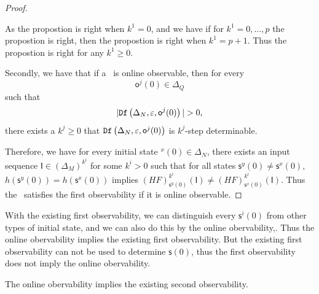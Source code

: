 \begin{proof}
\begin{itemize}
\end{itemize}
As the propostion is right when $k^{1}=0$, and we have if for $k^{1}=0,\ldots, p$ the propostion is right, then the propostion is right when $k^{1}=p+1$. Thus the propostion is right for any $k^{1}\ge0$.

Secondly, we have that if a \BCN\ is online observable,
then for every  \[\mathsf{o}^{j}(0)\in \Delta_Q\] such that \[|\Ded\left(\Delta_N,\varepsilon, \mathsf{o}^{j}(0)\right)|> 0,\] there exists a $k^{j}\ge0$ that ${\tt Df}\left(\Delta_N,\varepsilon,\mathsf{o}^{j}(0)\right)$ is $k^{j}$-step determinable. 

Therefore, we have for every initial state \State$^{x}(0)$$\in \Delta_N$, there exists an input sequence $\mathsf{I}\in(\Delta_M)^{k^i}$ for some $k^i >0$ such that for all states $\mathsf{s}^{y}(0)\neq \mathsf{s}^{x}(0)$, $h(\mathsf{s}^{y}(0))=h(\mathsf{s}^{x}(0))$ implies $(HF)^{k^i}_{\mathsf{s}^{y}(0)}(\mathsf{I})\neq (HF)^{k^i}_{{\mathsf{s}^{x}(0)}}(\mathsf{I})$. Thus the \BCN\ satisfies the first observability if it is online observable.

\end{proof}

With the existing first observability, we can distinguish every $\mathsf{s}^{i}(0)$ from other types of initial state,  and we can also do this by the online obervability,. Thus the online obervability implies the existing first observability. But the existing first observability can not be used to determine $\mathsf{s}(0)$, thus the first observability does not imply the online obervability.

\begin{lemma}
The online obervability implies the existing second observability.
\label{lemm:4}
\end{lemma}


